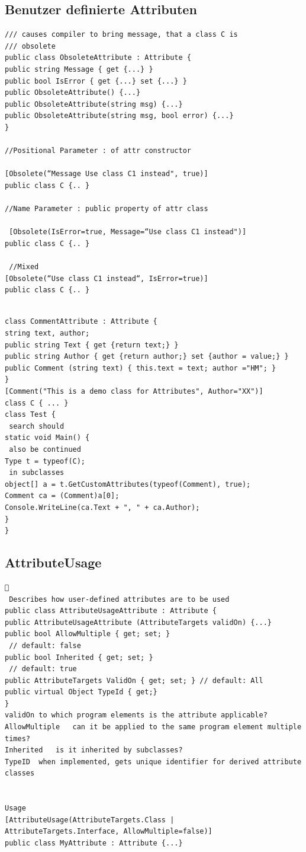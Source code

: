 \documentclass[a4paper,10pt]{scrartcl}
\begin{document}
\subsection{Benutzer definierte Attributen}
\begin{lstlisting}[caption=Benutzerdefinierte Attributen]
 /// causes compiler to bring message, that a class C is
/// obsolete
public class ObsoleteAttribute : Attribute {
public string Message { get {...} }
public bool IsError { get {...} set {...} }
public ObsoleteAttribute() {...}
public ObsoleteAttribute(string msg) {...}
public ObsoleteAttribute(string msg, bool error) {...}
}

//Positional Parameter : of attr constructor

[Obsolete(“Message Use class C1 instead", true)]
public class C {.. }

//Name Parameter : public property of attr class

 [Obsolete(IsError=true, Message=“Use class C1 instead")]
public class C {.. }
 
 //Mixed
[Obsolete(“Use class C1 instead“, IsError=true)]
public class C {.. }


\end{lstlisting}
\begin{lstlisting}[caption=Querying Attributes]
 class CommentAttribute : Attribute {
string text, author;
public string Text { get {return text;} }
public string Author { get {return author;} set {author = value;} }
public Comment (string text) { this.text = text; author ="HM"; }
}
[Comment("This is a demo class for Attributes", Author="XX")]
class C { ... }
class Test {
 search should
static void Main() {
 also be continued
Type t = typeof(C);
 in subclasses
object[] a = t.GetCustomAttributes(typeof(Comment), true);
Comment ca = (Comment)a[0];
Console.WriteLine(ca.Text + ", " + ca.Author);
}
}

\end{lstlisting}

\subsection{AttributeUsage}
\begin{lstlisting}[basicstyle=\footnotesize\ttfamily]
 
 Describes how user-defined attributes are to be used
public class AttributeUsageAttribute : Attribute {
public AttributeUsageAttribute (AttributeTargets validOn) {...}
public bool AllowMultiple { get; set; }
 // default: false
public bool Inherited { get; set; }
 // default: true
public AttributeTargets ValidOn { get; set; } // default: All
public virtual Object TypeId { get;}
}
validOn	to which program elements is the attribute applicable?
AllowMultiple	can it be applied to the same program element multiple times?
Inherited	is it inherited by subclasses?
TypeID	when implemented, gets unique identifier for derived attribute classes


Usage
[AttributeUsage(AttributeTargets.Class |
AttributeTargets.Interface, AllowMultiple=false)]
public class MyAttribute : Attribute {...}

\end{lstlisting}
\end{document}
